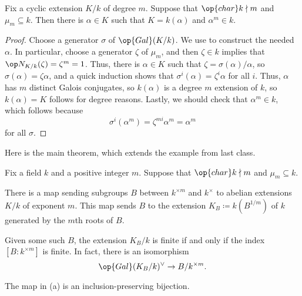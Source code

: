 \documentclass[../notes.tex]{subfiles}
\begin{document}
\begin{corollary} \label{cor:classify-cyclic-kummer}
	Fix a cyclic extension $K/k$ of degree $m$. Suppose that $\op{char}k\nmid m$ and $\mu_m\subseteq k$. Then there is $\alpha\in K$ such that $K=k(\alpha)$ and $\alpha^m\in k$.
\end{corollary}
\begin{proof}
	Choose a generator $\sigma$ of $\op{Gal}(K/k)$. We use  to construct the needed $\alpha$. In particular, choose a generator $\zeta$ of $\mu_m$, and then $\zeta\in k$ implies that $\op N_{K/k}(\zeta)=\zeta^m=1$. Thus, there is $\alpha\in K$ such that $\zeta=\sigma(\alpha)/\alpha$, so $\sigma(\alpha)=\zeta\alpha$, and a quick induction shows that $\sigma^i(\alpha)=\zeta^i\alpha$ for all $i$. Thus, $\alpha$ has $m$ distinct Galois conjugates, so $k(\alpha)$ is a degree $m$ extension of $k$, so $k(\alpha)=K$ follows for degree reasons. Lastly, we should check that $\alpha^m\in k$, which follows because
	\[\sigma^i\left(\alpha^m\right)=\zeta^{mi}\alpha^m=\alpha^m\]
	for all $\sigma$.
\end{proof}
Here is the main theorem, which extends the example from last class.
\begin{theorem}[Kummer]
	Fix a field $k$ and a positive integer $m$. Suppose that $\op{char}k\nmid m$ and $\mu_m\subseteq k$.
	\begin{listalph}
		\item There is a map sending subgroups $B$ between $k^{\times m}$ and $k^\times$ to abelian extensions $K/k$ of exponent $m$. This map sends $B$ to the extension $K_B\coloneqq k(B^{1/m})$ of $k$ generated by the $m$th roots of $B$.
		\item Given some such $B$, the extension $K_B/k$ is finite if and only if the index $\left[B:k^{\times m}\right]$ is finite. In fact, there is an isomorphism
		\[\op{Gal}(K_B/k)^\lor\to B/k^{\times m}.\]
		\item The map in (a) is an inclusion-preserving bijection.
	\end{listalph}
\end{theorem}
\end{document}
